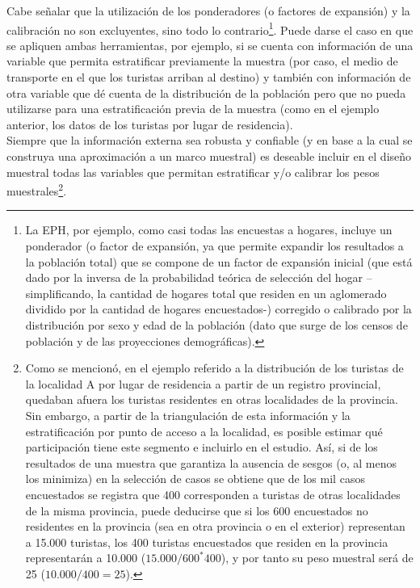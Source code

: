 \documentclass[
]{book}
\begin{document}
Cabe señalar que la utilización de los ponderadores (o factores de expansión) y la calibración no son excluyentes, sino todo lo contrario\footnote{La EPH, por ejemplo, como casi todas las encuestas a hogares, incluye un ponderador (o factor de expansión, ya que permite expandir los resultados a la población total) que se compone de un factor de expansión inicial (que está dado por la inversa de la probabilidad teórica de selección del hogar --simplificando, la cantidad de hogares total que residen en un aglomerado dividido por la cantidad de hogares encuestados-) corregido o calibrado por la distribución por sexo y edad de la población (dato que surge de los censos de población y de las proyecciones demográficas).}. Puede darse el caso en que se apliquen ambas herramientas, por ejemplo, si se cuenta con información de una variable que permita estratificar previamente la muestra (por caso, el medio de transporte en el que los turistas arriban al destino) y también con información de otra variable que dé cuenta de la distribución de la población pero que no pueda utilizarse para una estratificación previa de la muestra (como en el ejemplo anterior, los datos de los turistas por lugar de residencia).\\

Siempre que la información externa sea robusta y confiable (y en base a la cual se construya una aproximación a un marco muestral) es deseable incluir en el diseño muestral todas las variables que permitan estratificar y/o calibrar los pesos muestrales\footnote{Como se mencionó, en el ejemplo referido a la distribución de los turistas de la localidad A por lugar de residencia a partir de un registro provincial, quedaban afuera los turistas residentes en otras localidades de la provincia. Sin embargo, a partir de la triangulación de esta información y la estratificación por punto de acceso a la localidad, es posible estimar qué participación tiene este segmento e incluirlo en el estudio. Así, si de los resultados de una muestra que garantiza la ausencia de sesgos (o, al menos los minimiza) en la selección de casos se obtiene que de los mil casos encuestados se registra que 400 corresponden a turistas de otras localidades de la misma provincia, puede deducirse que si los 600 encuestados no residentes en la provincia (sea en otra provincia o en el exterior) representan a 15.000 turistas, los 400 turistas encuestados que residen en la provincia representarán a 10.000 (\(15.000/600^*400\)), y por tanto su peso muestral será de 25 (\(10.000/400=25\)).}.
\end{document}
